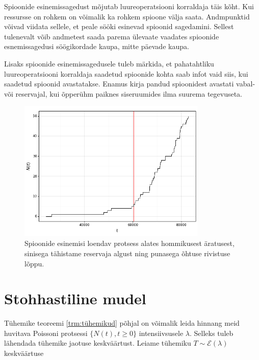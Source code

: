\documentclass{article}
\theoremstyle{definition}
\begin{document}

Spioonide esinemissagedust mõjutab luureoperatsiooni korraldaja täis kõht. Kui ressursse on rohkem on võimalik ka rohkem spioone välja saata. Andmpunktid võivad viidata sellele, et peale sööki esinevad spioonid sagedamini. Sellest tulenevalt võib andmetest saada parema ülevaate vaadates spioonide esnemissagedusi söögikordade kaupa, mitte päevade kaupa.

Lisaks spioonide esinemissagedusele tuleb märkida, et pahatahtliku luureoperatsiooni korraldaja saadetud spioonide kohta saab infot vaid siis, kui saadetud spioonid avastatakse. Enamus kirja pandud spioonidest avastati vabal- või reservajal, kui õpperühm paiknes siseruumides ilma suurema tegevuseta.

\begin{figure}[t]
    \centering
    \includegraphics[width=0.8\textwidth]{spioonid_astmejoonis.png}
    \vspace*{-5mm}
    \caption{Spioonide esinemisi loendav protsess alates hommikusest äratusest, sinisega tähistame reservaja algust ning punasega õhtuse rivistuse lõppu.}
    \label{fig:spioonid astmejoonis}
\end{figure}


\section{Stohhastiline mudel}


Tühemike teoreemi \ref{trm:tühemikud} põhjal on võimalik leida hinnang meid huvitava Poissoni protsessi $\{ N(t) , t \geq 0 \}$ intensiivsusele $\lambda$. Selleks tuleb lähendada tühemike jaotuse keskväärtust. Leiame tühemiku $T \sim \mathcal{E}(\lambda)$ keskväärtuse
\end{document}
